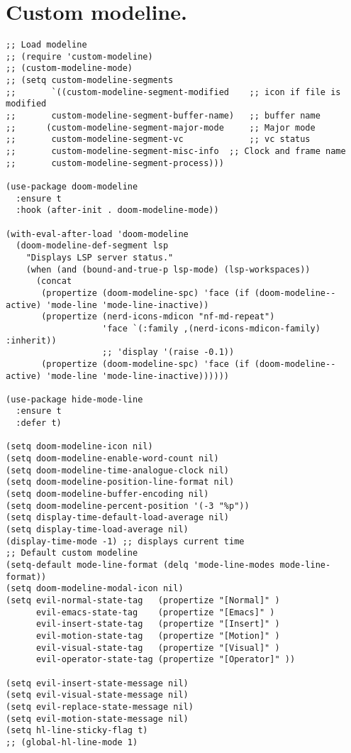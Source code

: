 \documentclass[11pt]{article}
\begin{document}
\section{Custom modeline.}
\label{sec:org00aa86b}
\begin{verbatim}
;; Load modeline
;; (require 'custom-modeline)
;; (custom-modeline-mode)
;; (setq custom-modeline-segments
;;       `((custom-modeline-segment-modified	;; icon if file is modified 
;; 		 custom-modeline-segment-buffer-name)	;; buffer name
;; 		(custom-modeline-segment-major-mode 	;; Major mode
;; 		 custom-modeline-segment-vc 			;; vc status
;; 		 custom-modeline-segment-misc-info 	;; Clock and frame name
;; 		 custom-modeline-segment-process)))

(use-package doom-modeline
  :ensure t
  :hook (after-init . doom-modeline-mode))

(with-eval-after-load 'doom-modeline
  (doom-modeline-def-segment lsp
    "Displays LSP server status."
    (when (and (bound-and-true-p lsp-mode) (lsp-workspaces))
      (concat
       (propertize (doom-modeline-spc) 'face (if (doom-modeline--active) 'mode-line 'mode-line-inactive))
       (propertize (nerd-icons-mdicon "nf-md-repeat")
                   'face `(:family ,(nerd-icons-mdicon-family) :inherit))
                   ;; 'display '(raise -0.1))
       (propertize (doom-modeline-spc) 'face (if (doom-modeline--active) 'mode-line 'mode-line-inactive))))))

(use-package hide-mode-line
  :ensure t
  :defer t)

(setq doom-modeline-icon nil)
(setq doom-modeline-enable-word-count nil)
(setq doom-modeline-time-analogue-clock nil)
(setq doom-modeline-position-line-format nil)
(setq doom-modeline-buffer-encoding nil)
(setq doom-modeline-percent-position '(-3 "%p"))
(setq display-time-default-load-average nil)
(setq display-time-load-average nil)
(display-time-mode -1) ;; displays current time
;; Default custom modeline
(setq-default mode-line-format (delq 'mode-line-modes mode-line-format))
(setq doom-modeline-modal-icon nil)
(setq evil-normal-state-tag   (propertize "[Normal]" )
      evil-emacs-state-tag    (propertize "[Emacs]" )
      evil-insert-state-tag   (propertize "[Insert]" )
      evil-motion-state-tag   (propertize "[Motion]" )
      evil-visual-state-tag   (propertize "[Visual]" )
      evil-operator-state-tag (propertize "[Operator]" ))

(setq evil-insert-state-message nil)
(setq evil-visual-state-message nil)
(setq evil-replace-state-message nil)
(setq evil-motion-state-message nil)
(setq hl-line-sticky-flag t)
;; (global-hl-line-mode 1)


\end{verbatim}
\end{document}
